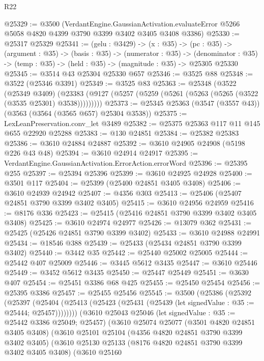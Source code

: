 \begin{lexlean}{R22}
\begin{coremodule}
@25329 := @3500
    (VerdantEngine.GaussianActivation.evaluateError
      @5266
      @5058
      @4820
      @4399
      @3790
      @3399
      @3402
      @3405
      @3408
      @3386)
@25330 := @25317 @25329
@25341 := (gelu : @3429) ->
  (x : @35) ->
  (pc : @35) ->
  (argument : @35) ->
  (basis : @35) ->
  (numerator : @35) ->
  (denominator : @35) -> (temp : @35) -> (held : @35) -> (magnitude : @35) -> @25305 @25330
@25345 := @3514 @43 @25304 @25330 @657
@25346 := @3525 @88
@25348 := @3522 (@25346 @3391)
@25349 := @3525 @83
@25363 := @25348
    (@3522
      (@25349 @3409)
      (@23383 (@9127 (@5257 (@5259 (@5261 (@5263 (@5265 (@3522 (@3535 @25301) @3538)))))))))
@25373 := @25345 @25363 (@3547 (@3557 @43)) (@3563 (@3564 (@3565 @657) @25304 @3538))
@25375 := LexLeanPreservation.conv_let @3489
@25382 := @25375 @25363 @117 @11 @145 @655 @22920 @25288
@25383 := @130 @24851
@25384 := @25382 @25383
@25386 := @3610 @24884 @24887
@25392 := @3610 @24905 @24908 (@5198 @226 @43 @48)
@25394 := @3610 @24914 @24917
@25395 := VerdantEngine.GaussianActivation.ErrorAction.errorWord
@25396 := @25395 @255
@25397 := @25394 @25396
@25399 := @3610 @24925 @24928
@25400 := @3501 @117
@25404 := @25399 (@25400 @24851 @3405 @3408)
@25406 := @3610 @24939 @24942
@25407 := @4356 @303
@25413 := @25406 (@25407 @24851 @3790 @3399 @3402 @3405)
@25415 := @3610 @24956 @24959
@25416 := @8176 @336
@25423 := @25415 (@25416 @24851 @3790 @3399 @3402 @3405 @3408)
@25425 := @3610 @24974 @24977
@25426 := @13079 @362
@25431 := @25425 (@25426 @24851 @3790 @3399 @3402)
@25433 := @3610 @24988 @24991
@25434 := @18546 @388
@25439 := @25433 (@25434 @24851 @3790 @3399 @3402)
@25440 := @3442 @35
@25442 := @25440 @25002 @25005
@25444 := @25442 @407 @25009
@25446 := @3445 @5612 @3435
@25447 := @3610 @25446
@25449 := @3452 @5612 @3435
@25450 := @25447 @25449
@25451 := @3630 @407
@25454 := @25451 @3386 @68 @425
@25455 := @25450 @25454
@25456 := @25395 @3386
@25457 := @25455 @25456
@25545 := @3500
    (@25386
      (@25392
        (@25397
          (@25404 (@25413 (@25423 (@25431 (@25439 (let signedValue : @35 := @25444; @25457))))))))
      (@3610
        @25043
        @25046
        (let signedValue : @35 := @25442 @3386 @25049; @25457)
        (@3610
          @25074
          @25077
          (@3501 @4820 @24851 @3405 @3408)
          (@3610
            @25101
            @25104
            (@4356 @4820 @24851 @3790 @3399 @3402 @3405)
            (@3610
              @25130
              @25133
              (@8176 @4820 @24851 @3790 @3399 @3402 @3405 @3408)
              (@3610
                @25160

\end{coremodule}
\end{lexlean}
